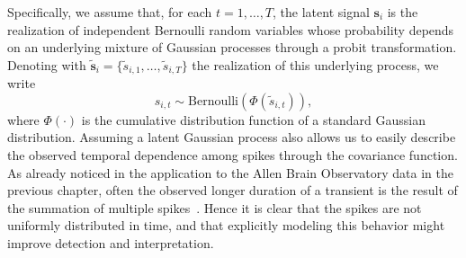 Specifically, we assume that, for each $t=1,\dots,T$, the latent signal $\bm{s}_i$ is the realization of independent Bernoulli random variables whose probability depends on an underlying mixture of Gaussian processes through a probit transformation. Denoting with $\tilde{\bm{s}}_i = \{\tilde{s}_{i,1},\dots,\tilde{s}_{i,T}\}$ the realization of this underlying process, we write
\begin{equation*}
s_{i,t} \sim \mathrm{Bernoulli}(\Phi(\tilde{s}_{i,t})),
\end{equation*}
where $\Phi(\cdot)$ is the cumulative distribution function of a standard Gaussian distribution.
Assuming a latent Gaussian process also allows us to easily describe the observed temporal dependence among spikes through the covariance function. As already noticed in the application to the Allen Brain Observatory data in the previous chapter, often the observed longer duration of a transient is the result of the summation of multiple spikes~\parencite{dombeck2010}. Hence it is clear that the spikes are not uniformly distributed in time, and that explicitly modeling this behavior might improve detection and interpretation.

